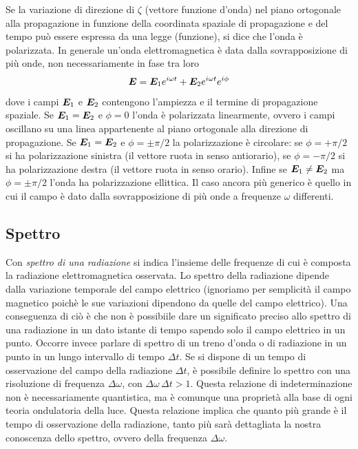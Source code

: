 Se la variazione di direzione di $\zeta$ (vettore funzione d'onda) nel piano ortogonale alla propagazione in funzione della coordinata spaziale di propagazione e del tempo può essere espressa da una legge (funzione), si dice che l'onda è polarizzata. 
In generale un'onda elettromagnetica è data dalla sovrapposizione di più onde, non necessariamente in fase tra loro
\begin{equation}
\V{E}=\V{E}_1 e^{i\omega t} + \V{E}_2 e^{i\omega t} e^{i\phi}
\end{equation}
dove i campi $\V{E}_1$ e $\V{E}_2$ contengono l'ampiezza e il termine di propagazione spaziale. Se $\V{E}_1=\V{E}_2$ e $\phi=0$ l'onda è polarizzata linearmente, ovvero i campi oscillano su una linea appartenente al piano ortogonale alla direzione di propagazione. Se $\V{E}_1=\V{E}_2$ e $\phi = \pm \pi/2$ la polarizzazione è circolare: se $\phi=+\pi/2$ si ha polarizzazione sinistra (il vettore ruota in senso antiorario), se $\phi=-\pi/2$ si ha polarizzazione destra (il vettore ruota in senso orario). Infine se $\V{E}_1\neq\V{E}_2$ ma $\phi = \pm \pi/2$ l'onda ha polarizzazione ellittica. 
Il caso ancora più generico è quello in cui il campo è dato dalla sovrapposizione di più onde a frequenze $\omega$ differenti.

\subsection{Spettro}
Con \textit{spettro di una radiazione} si indica l'insieme delle frequenze di cui è composta la radiazione elettromagnetica osservata.
Lo spettro della radiazione dipende dalla variazione temporale del campo elettrico (ignoriamo per semplicità il campo magnetico poichè le sue variazioni dipendono da quelle del campo elettrico). Una conseguenza di ciò è che non è possibiile dare un significato preciso allo spettro di una radiazione in un dato istante di tempo sapendo solo il campo elettrico in un punto. Occorre invece parlare di spettro di un treno d'onda o di radiazione in un punto in un lungo intervallo di tempo $\Delta t$. Se si dispone di un tempo di osservazione del campo della radiazione $\Delta t$, è possibile definire lo spettro con una risoluzione di frequenza $\Delta \omega$, con $\Delta \omega \, \Delta t >1$. Questa relazione di indeterminazione non è necessariamente quantistica, ma è comunque una proprietà alla base di ogni teoria ondulatoria della luce. Questa relazione implica che quanto più grande è il tempo di osservazione della radiazione, tanto più sarà dettagliata la nostra conoscenza dello spettro, ovvero della frequenza $\Delta\omega$.


